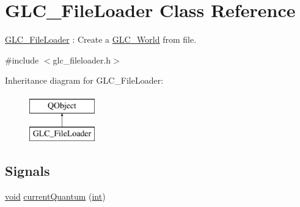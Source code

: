 \hypertarget{class_g_l_c___file_loader}{\section{G\-L\-C\-\_\-\-File\-Loader Class Reference}
\label{class_g_l_c___file_loader}
}


\hyperlink{class_g_l_c___file_loader}{G\-L\-C\-\_\-\-File\-Loader} \-: Create a \hyperlink{class_g_l_c___world}{G\-L\-C\-\_\-\-World} from file.  




{\ttfamily \#include $<$glc\-\_\-fileloader.\-h$>$}

Inheritance diagram for G\-L\-C\-\_\-\-File\-Loader\-:\begin{figure}[H]
\begin{center}
\leavevmode
\includegraphics[height=2.000000cm]{class_g_l_c___file_loader}
\end{center}
\end{figure}
\subsection*{Signals}
\begin{DoxyCompactItemize}
\item 
\hyperlink{group___u_a_v_objects_plugin_ga444cf2ff3f0ecbe028adce838d373f5c}{void} \hyperlink{class_g_l_c___file_loader_addcd75da89a2b7b1981c658d60ce3205}{current\-Quantum} (\hyperlink{ioapi_8h_a787fa3cf048117ba7123753c1e74fcd6}{int})
\end{DoxyCompactItemize}
